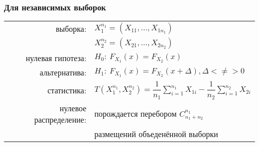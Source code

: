 \documentclass[a4paper,12pt]{article}
\begin{document}
\subsubsection{Для независимых выборок}

\begin{table}[h]
	\begin{tabular}{rl}
выборка:& $ X_{1}^{n_{1}} = \left( X_{11}, \ldots, X_{1n_{1}} \right) $ \\
       & $ X_{2}^{n_{2}} = \left( X_{21}, \ldots, X_{2n_{2}} \right) $ \\
нулевая гипотеза: & $ H_{0}:~ F_{X_{1}}(x) = F_{X_{2}}(x) $ \\
альтернатива: & $ H_{1}:~ F_{X_{1}}(x) = F_{X_{2}}(x + \Delta), \Delta <\neq> 0 $ \\
статистика: & $ T\left( X_{1}^{n_{1}}, X_{2}^{n_{2}} \right) =  \dfrac{1}{n_{1}} \sum \limits_{i=1}^{n_{1}}X_{1i} - \dfrac{1}{n_{2}} \sum \limits_{i=1}^{n_{2}}X_{2i} $ \\
нулевое распределение: & порождается перебором $ C_{n_{1}+n_{2}}^{n_{1}} $ \\
                   & размещений объеденённой выборки
	\end{tabular}
\end{table}
\end{document}
